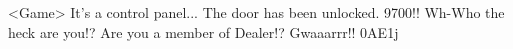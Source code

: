 <Game> It's a control panel... 
The door has been unlocked. 
{97}{00}!! 
Wh-Who the heck are you!? Are you a member of Dealer!? 
Gwaaarrr!! 
{0A}{E1}j
